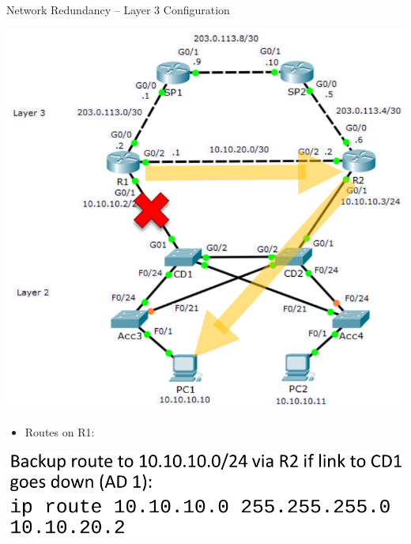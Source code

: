 \documentclass[pdflatex,compress,mathserif]{beamer}
\begin{document}
\begin{frame}{Network Redundancy – Layer 3 Configuration}
	\begin{multicols}{2}
		\begin{center}
			\includegraphics[width=\linewidth]{img/img08}
		\end{center}
		\columnbreak
		\begin{itemize}
			\item Routes on R1:
		\end{itemize}
		\begin{center}
			\includegraphics[width=\linewidth]{img/img09}
		\end{center}
	\end{multicols}
\end{frame}
\end{document}
